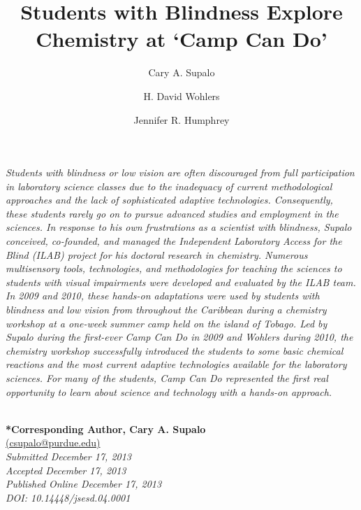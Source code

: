 \documentclass[11.5pt]{sig-alternate} %
\makeatletter
\let\oldabstract\abstract
\let\oldendabstract\endabstract
\renewenvironment{abstract} %
{\renewenvironment{quotation}%
               {\list{}{\addtolength{\leftmargin}{1em} %
                        \listparindent 1.5em%
                        \itemindent    \listparindent%
                        \rightmargin   \leftmargin%
                        \parsep        \z@ \@plus\p@}%
                \item\relax}%
               {\endlist}%
\oldabstract}
{\oldendabstract}
\makeatother
\begin{document}
\title{Students with Blindness Explore Chemistry at ‘Camp Can Do’}

\author[1]{\large \color{blue} Cary A. Supalo}
\author[2]{\large \color{blue} H. David Wohlers}
\author[3]{\large \color{blue} Jennifer R. Humphrey}


\toappear{}

\maketitle
\begin{@twocolumnfalse} 
\begin{abstract}
\item 
\begin{large}
\textit{Students with blindness or low vision are often discouraged from full participation in laboratory science classes due to the inadequacy of current methodological approaches and the lack of sophisticated adaptive technologies. Consequently, these students rarely go on to pursue advanced studies and employment in the sciences. In response to his own frustrations as a scientist with blindness, Supalo conceived, co-founded, and managed the Independent Laboratory Access for the Blind (ILAB) project for his doctoral research in chemistry. Numerous multisensory tools, technologies, and methodologies for teaching the sciences to students with visual impairments were developed and evaluated by the ILAB team. In 2009 and 2010, these hands-on adaptations were used by students with blindness and low vision from throughout the Caribbean during a chemistry workshop at a one-week summer camp held on the island of Tobago. Led by Supalo during the first-ever Camp Can Do in 2009 and Wohlers during 2010, the chemistry workshop successfully introduced the students to some basic chemical reactions and the most current adaptive technologies available for the laboratory sciences. For many of the students, Camp Can Do represented the first real opportunity to learn about science and technology with a hands-on approach.}
\\ \\
\end{large}     
\end{abstract}
\end{@twocolumnfalse}



\textbf{*Corresponding Author, Cary A. Supalo}\\
\href{mailto:csupalo@purdue.edu}{(csupalo@purdue.edu)}\\
\textit{Submitted December 17, 2013}\\
\textit{Accepted December 17, 2013}\\
\textit{Published Online December 17, 2013}\\
\textit{DOI: 10.14448/jsesd.04.0001}\\
\end{document}
